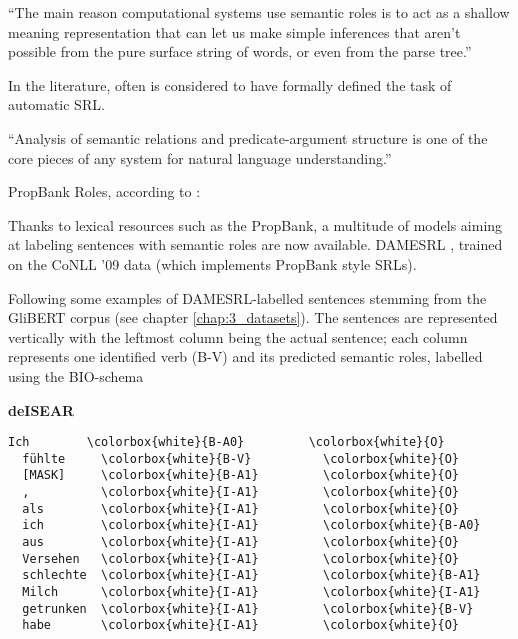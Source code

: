 ``The main reason computational systems use semantic roles is to act as a shallow meaning
representation that can let us make simple inferences that aren’t possible from the pure surface
string of words, or even from the parse tree.'' \cite[p.~375]{jurafsky2019speech}

In the literature, often \cite{gildea2002automatic} is considered to have formally defined the
task of automatic SRL.

``Analysis of semantic relations and predicate-argument structure is one of the core pieces of any
system for natural language understanding.'' \citep{palmer2010semantic}

PropBank Roles, according to \cite{bonial2012english}:

Thanks to lexical resources such as the PropBank, a multitude of models aiming at labeling
sentences with semantic roles are now available. DAMESRL \citep{do2018flexible}, trained on
the CoNLL '09 \citep{hajivc2009conll} data (which implements PropBank style SRLs).

Following some examples of DAMESRL-labelled sentences stemming from the GliBERT corpus (see chapter
\ref{chap:3_datasets}). The sentences are represented vertically with the leftmost column being the
actual sentence; each column represents one identified verb (B-V) and its predicted semantic roles,
labelled using the BIO-schema

\textbf{deISEAR}

\begin{Verbatim}[commandchars=\\\{\}]
  Ich        \colorbox{white}{B-A0}         \colorbox{white}{O}
  fühlte     \colorbox{white}{B-V}          \colorbox{white}{O}
  [MASK]     \colorbox{white}{B-A1}         \colorbox{white}{O}
  ,          \colorbox{white}{I-A1}         \colorbox{white}{O}
  als        \colorbox{white}{I-A1}         \colorbox{white}{O}
  ich        \colorbox{white}{I-A1}         \colorbox{white}{B-A0}
  aus        \colorbox{white}{I-A1}         \colorbox{white}{O}
  Versehen   \colorbox{white}{I-A1}         \colorbox{white}{O}
  schlechte  \colorbox{white}{I-A1}         \colorbox{white}{B-A1}
  Milch      \colorbox{white}{I-A1}         \colorbox{white}{I-A1}
  getrunken  \colorbox{white}{I-A1}         \colorbox{white}{B-V}
  habe       \colorbox{white}{I-A1}         \colorbox{white}{O}
\end{Verbatim}

